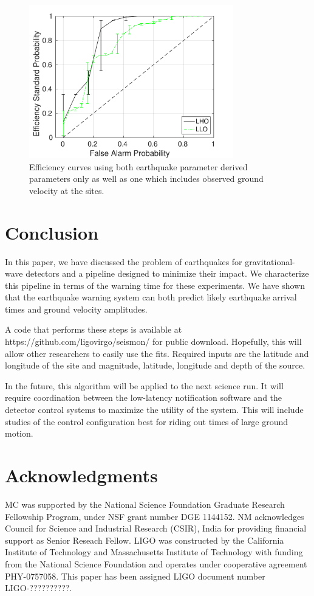 \documentclass[reprint, prl, aps, showpacs]{revtex4-1}
\begin{document}
\begin{figure}[h]
 \includegraphics[width=3.5in]{lockloss_fap_errorbars.pdf}
 \centering
 \caption{Efficiency curves using both earthquake parameter derived parameters only as well as one which includes observed ground velocity at the sites.}
 \label{fig:MLA}
\end{figure}
	

\section{Conclusion}
\label{sec:conclusions}

In this paper, we have discussed the problem of earthquakes for gravitational-wave detectors and a pipeline designed to minimize their impact. 
We characterize this pipeline in terms of the warning time for these experiments.
We have shown that the earthquake warning system can both predict likely earthquake arrival times and ground velocity amplitudes. 

A code that performs these steps is available at https://github.com/ligovirgo/seismon/ for public download. Hopefully, this will allow other researchers to easily use the fits. Required inputs are the latitude and longitude of the site and magnitude, latitude, longitude and depth of the source.

In the future, this algorithm will be applied to the next science run. It will require coordination between the low-latency notification software and the detector control systems to maximize the utility of the system. This will include studies of the control configuration best for riding out times of large ground motion.

\section{Acknowledgments}
MC was supported by the National Science Foundation Graduate Research Fellowship
Program, under NSF grant number DGE 1144152. 
NM acknowledges Council for Science and Industrial Research (CSIR), India for providing financial support as Senior Reseach Fellow.  
LIGO was constructed by the California Institute of Technology and Massachusetts Institute of Technology with funding from the National Science Foundation and operates under cooperative agreement PHY-0757058.
This paper has been assigned LIGO document number LIGO-??????????.



\end{document}
